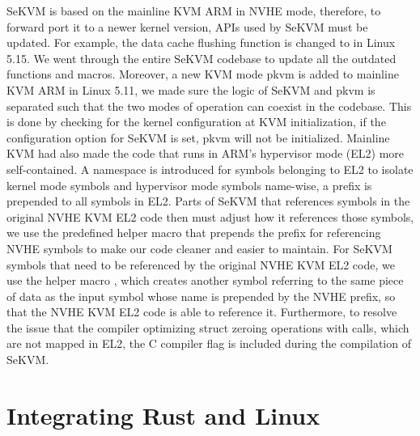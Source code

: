 SeKVM is based on the mainline KVM ARM in NVHE mode, therefore, to forward port
it to a newer kernel version, APIs used by SeKVM must be updated. For example,
the data cache flushing function  is changed to
 in Linux 5.15. We went through the entire
SeKVM codebase to update all the outdated functions and macros.
Moreover, a new KVM mode pkvm \cite{pkvm} is added to mainline KVM ARM in Linux
5.11, we made sure the logic of SeKVM and pkvm is separated such that the two
modes of operation can coexist in the codebase. This is done by checking for
the kernel configuration at KVM initialization, if the configuration option for
SeKVM is set, pkvm will not be initialized.
Mainline KVM had also made the code that runs in ARM's hypervisor mode (EL2)
more self-contained. A namespace is introduced for symbols belonging to EL2 to
isolate kernel mode symbols and hypervisor mode symbols name-wise, a prefix
 is prepended to all symbols in EL2.
Parts of SeKVM that references symbols in the original NVHE KVM EL2 code then
must adjust how it references those symbols, we use the predefined helper macro
 that prepends the prefix for referencing NVHE
symbols to make our code cleaner and easier to maintain. For SeKVM symbols that
need to be referenced by the original NVHE KVM EL2 code, we use the helper
macro , which creates another symbol referring to the
same piece of data as the input symbol whose name is prepended by the NVHE
prefix, so that the NVHE KVM EL2 code is able to reference it.
Furthermore, to resolve the issue that the compiler optimizing struct zeroing
operations with  calls, which are not mapped in EL2, the C
compiler flag  is included during the compilation of
SeKVM.

\section{Integrating Rust and Linux}

%

